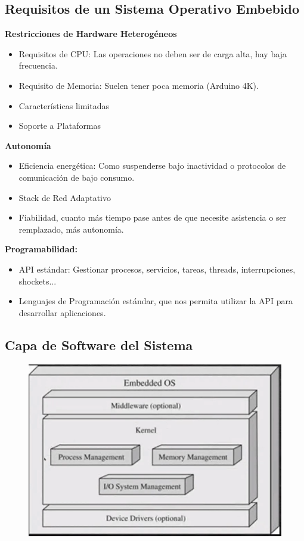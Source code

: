 \documentclass[12pt]{report} %
\begin{document}
\subsection{Requisitos de un Sistema Operativo Embebido}
\textbf{Restricciones de Hardware Heterogéneos}
\begin{itemize}	
	\item Requisitos de CPU: Las operaciones no deben ser de carga alta, hay baja frecuencia.
	\item Requisito de Memoria: Suelen tener poca memoria (Arduino 4K).
	\item Características limitadas
	\item Soporte a Plataformas
\end{itemize}

\textbf{Autonomía}
\begin{itemize}	
	\item Eficiencia energética: Como suspenderse bajo inactividad o protocolos de comunicación de bajo consumo.
	\item Stack de Red Adaptativo
	\item Fiabilidad, cuanto más tiempo pase antes de que necesite asistencia o ser remplazado, más autonomía.
\end{itemize}

\textbf{Programabilidad:} 
\begin{itemize}
	\item API estándar: Gestionar procesos, servicios, tareas, threads, interrupciones, shockets...
	\item Lenguajes de Programación estándar, que nos permita utilizar la API para desarrollar aplicaciones. 
\end{itemize}

\subsection{Capa de Software del Sistema}
\begin{figure}[H]
	{\includegraphics[scale=.5]{2021-03-25 10_06_39-2021-03-24 16-59-20.mkv.png}}
\end{figure}
\end{document}

